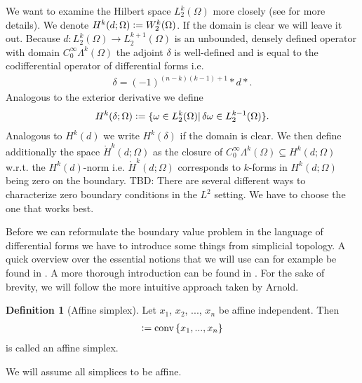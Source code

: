 \documentclass[12pt,a4paper]{article}
\theoremstyle{definition}
\newtheorem{definition}{Definition}
\begin{document}
We want to examine the Hilbert space $L^k_2(\Omega)$ more closely
(see \cite[Sec. 6.2.6]{arnold} for more details).  
We denote $H^k(d;\Omega) \vcentcolon= W^k_2(\Omega)$. If the domain is clear
we will leave it out.
Because $d:L^k_2(\Omega) \rightarrow L^{k+1}_2(\Omega)$
is an unbounded, densely defined operator with domain 
$C_0^\infty \Lambda^{k}(\Omega)$ the adjoint $\delta$ is well-defined and is 
equal to the codifferential operator of differential forms i.e.
\begin{align*}
    \delta = (-1)^{(n-k)(k-1)+1} * d *.
\end{align*}
Analogous to the
exterior derivative we define 
\begin{align*}
    H^k(\delta;\Omega) \vcentcolon= \{ \omega \in L^k_2(\Omega) | \, 
    \delta \omega \in L^{k-1}_2 (\Omega) \}. 
\end{align*}
Analogous to $H^k(d)$ we write $H^k(\delta)$ if the domain is clear.
We then define 
additionally the space $\mathring{H}^k(d;\Omega)$ as the closure of 
$C_0^\infty \Lambda^k(\Omega) \subseteq H^k(d;\Omega)$ w.r.t. 
the $H^k(d)$-norm i.e. 
$\mathring{H}^k(d;\Omega)$ corresponds to $k$-forms in $H^k(d;\Omega)$
being zero on the boundary. {\color{red} TBD: There are several different 
ways to characterize zero boundary conditions in the $L^2$ setting. We have
to choose the one that works best.}


Before we can reformulate the boundary value problem in the language of 
differential forms we have to 
introduce some things from simplicial topology. A quick overview over the
essential notions that we will use can for example be found in 
\cite[Chapter 2]{arnold}. A more thorough introduction can be found in 
\cite[Chapter 4]{topology_and_geometry}. For the sake of brevity, we will 
follow the more intuitive approach taken by Arnold.


\begin{definition}[Affine simplex]
    Let $x_1$, $x_2$, ..., $x_n$ be affine independent. Then 
    \begin{align*}
    [x_1,x_2,...,x_n] \vcentcolon= \text{conv}\,\{x_1,...,x_n\}
    \end{align*}
    is called an affine simplex.
\end{definition}
\noindent We will assume all simplices to be affine.
\end{document}
